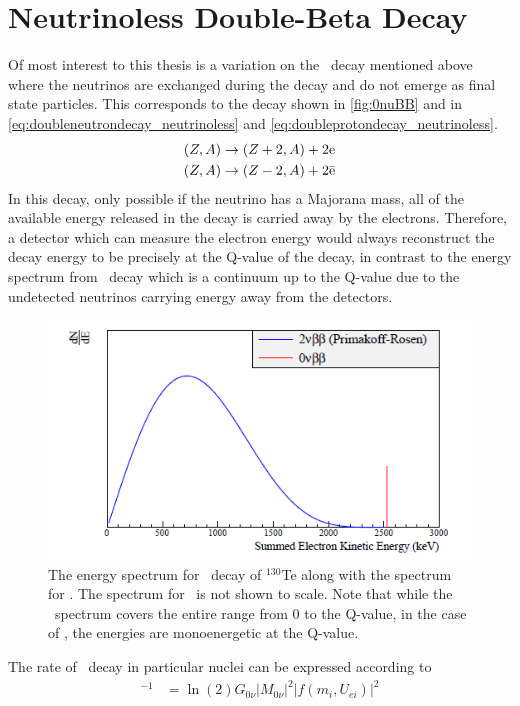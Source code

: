 \section{Neutrinoless Double-Beta Decay}
\label{sec:Neutrinoless Double Beta Decay}
Of most interest to this thesis is a variation on the \twonubb~decay mentioned above where the neutrinos are exchanged during the decay and do not emerge as final state particles. This corresponds to the decay shown in \autoref{fig:0nuBB} and in \autoref{eq:doubleneutrondecay_neutrinoless} and \autoref{eq:doubleprotondecay_neutrinoless}.
\begin{align}
    (Z, A) & \rightarrow (Z+2, A)+2\textrm{e} \label{eq:doubleneutrondecay_neutrinoless} \\
    (Z, A) & \rightarrow (Z-2, A)+2\Bar{\textrm{e}} \label{eq:doubleprotondecay_neutrinoless} 
\end{align}
In this decay, only possible if the neutrino has a Majorana mass, all of the available energy released in the decay is carried away by the electrons. Therefore, a detector which can measure the electron energy would always reconstruct the decay energy to be precisely at the Q-value of the decay, in contrast to the energy spectrum from \twonubb~decay which is a continuum up to the Q-value due to the undetected neutrinos carrying energy away from the detectors.
\begin{figure}
    \centering
    \includegraphics[width=0.6\linewidth]{Figures/2nuBBSpectrum.png}
    \caption[The energy spectrum for \twonubb~decay of $^{130}$Te along with the spectrum for \zeronubb.]{The energy spectrum for \twonubb~decay of $^{130}$Te along with the spectrum for \zeronubb. The spectrum for \zeronubb~is not shown to scale. Note that while the \twonubb~spectrum covers the entire range from 0 to the Q-value, in the case of \zeronubb, the energies are monoenergetic at the Q-value.}
    \label{fig:2nuSpectrum}
\end{figure}
The rate of \zeronubb~decay in particular nuclei can be expressed according to 
\begin{align}
    [T^{0\nu}_{1/2}]^{-1}&=\ln(2)G_{0\nu}|M_{0\nu}|^2|f(m_i,U_{ei})|^2
    \label{eq:halflife}
\end{align}
